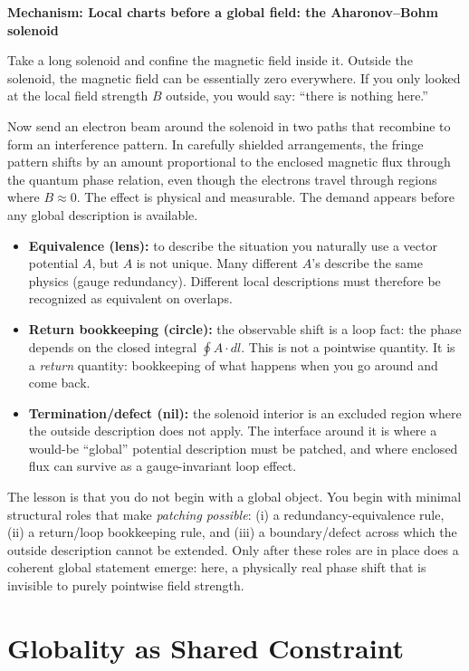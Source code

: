 \documentclass[11pt,twoside,openright]{book}
\newenvironment{mechanismbox}[1]
  {\begin{framed}\noindent\textbf{Mechanism: #1}\par\medskip}
  {\end{framed}}
\begin{document}
\begin{mechanismbox}{Local charts before a global field: the Aharonov--Bohm solenoid}
Take a long solenoid and confine the magnetic field inside it. Outside the solenoid, the magnetic field can be essentially zero everywhere. If you only looked at the local field strength $B$ outside, you would say: ``there is nothing here.''

Now send an electron beam around the solenoid in two paths that recombine to form an interference pattern. In carefully shielded arrangements, the fringe pattern shifts by an amount proportional to the enclosed magnetic flux through the quantum phase relation, even though the electrons travel through regions where $B \approx 0$. The effect is physical and measurable. The demand appears before any global description is available.

\begin{itemize}
\item \textbf{Equivalence (lens):} to describe the situation you naturally use a vector potential $A$, but $A$ is not unique. Many different $A$'s describe the same physics (gauge redundancy). Different local descriptions must therefore be recognized as equivalent on overlaps.
\item \textbf{Return bookkeeping (circle):} the observable shift is a loop fact: the phase depends on the closed integral $\oint A\cdot dl$. This is not a pointwise quantity. It is a \emph{return} quantity: bookkeeping of what happens when you go around and come back.
\item \textbf{Termination/defect (nil):} the solenoid interior is an excluded region where the outside description does not apply. The interface around it is where a would-be ``global'' potential description must be patched, and where enclosed flux can survive as a gauge-invariant loop effect.
\end{itemize}

The lesson is that you do not begin with a global object. You begin with minimal structural roles that make \emph{patching possible}: (i) a redundancy-equivalence rule, (ii) a return/loop bookkeeping rule, and (iii) a boundary/defect across which the outside description cannot be extended. Only after these roles are in place does a coherent global statement emerge: here, a physically real phase shift that is invisible to purely pointwise field strength.
\end{mechanismbox}
\chapter{Globality as Shared Constraint}
\end{document}
